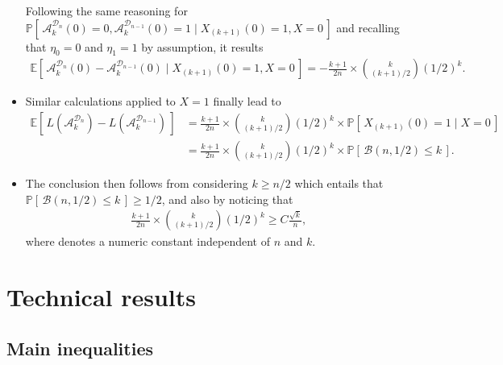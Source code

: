 \documentclass[twoside,11pt]{article}
\numberwithin{equation}{section}
\newcommand{\1}{\mathds{1}}%
\newcommand{\paren}[1]{\left( #1 \right)}
\newcommand{\croch}[1]{\left[\, #1 \,\right]}
\newcommand{\E}{\mathbb{E}}
\renewcommand{\P}{\mathbb{P}}
\newcommand{\D}{\mathcal{D}}
\newcommand{\Dn}{\mathcal{D}_n}
\newcommand{\A}{\mathcal{A}}
\numberwithin{equation}{section}
\theoremstyle{plain}
\begin{document}
\begin{itemize}
		Following the same reasoning for $\P\croch{ \A_k^{\Dn}(0)=0, \A_k^{\D_{n-1}}(0)=1 \mid   X_{(k+1)}(0)=1, X=0} $ and recalling that $\eta_0=0$ and $\eta_1=1$ by assumption, it results
		\begin{align*}
		\E\croch{ \A_k^{\Dn}(0) - \A_k^{\D_{n-1}}(0) \mid X_{(k+1)}(0)=1, X=0}  = - \frac{k+1}{2n}  \times {k \choose (k+1)/2} \paren{1/2}^{k} .
		\end{align*}

		\item Similar calculations applied to $X=1$ finally lead to
		\begin{align*}
		\E\croch{ L\paren{\A_k^{\Dn}} - L\paren{\A_k^{\D_{n-1}}}  }
		& = \frac{k+1}{2n}  \times {k \choose (k+1)/2} \paren{1/2}^{k} \times \P\croch{ X_{(k+1)}(0)=1 \mid X=0 } \\
		& = \frac{k+1}{2n}  \times {k \choose (k+1)/2} \paren{1/2}^{k} \times \P\croch{ \mathcal{B}(n,1/2)\leq k } .
		\end{align*}

		\item The conclusion then follows from considering $k\geq n/2$ which entails that $\P\croch{ \mathcal{B}(n,1/2)\leq k } \geq 1/2 $, and also by noticing that
		\begin{align*}
		\frac{k+1}{2n}  \times {k \choose (k+1)/2} \paren{1/2}^{k} \geq C \frac{\sqrt{k}}{n} ,
		\end{align*}
		where denotes a numeric constant independent of $n$ and $k$.
		\end{itemize}















\newpage
\section{Technical results}


\subsection{Main inequalities}
\end{document}
